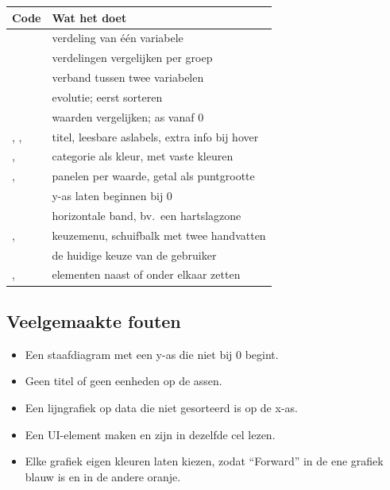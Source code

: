 \documentclass[11pt,a4paper]{article}
\begin{document}
\begin{center}
\begin{tabularx}{\textwidth}{@{}L{7.6cm}Y@{}}
\toprule
\textbf{Code} & \textbf{Wat het doet} \\
\midrule
{} & verdeling van één variabele \\
 & verdelingen vergelijken per groep \\
 & verband tussen twee variabelen \\
 & evolutie; eerst sorteren \\
 & waarden vergelijken; as vanaf 0 \\
, ,  & titel, leesbare aslabels, extra info bij hover \\
,  & categorie als kleur, met vaste kleuren \\
,  & panelen per waarde, getal als puntgrootte \\
 & y-as laten beginnen bij 0 \\
 & horizontale band, bv.\ een hartslagzone \\
,  & keuzemenu, schuifbalk met twee handvatten \\
 & de huidige keuze van de gebruiker \\
,  & elementen naast of onder elkaar zetten \\
\bottomrule
\end{tabularx}
\end{center}

\subsection*{Veelgemaakte fouten}

\begin{itemize}
  \item Een staafdiagram met een y-as die niet bij 0 begint.
  \item Geen titel of geen eenheden op de assen.
  \item Een lijngrafiek op data die niet gesorteerd is op de x-as.
  \item Een UI-element maken en zijn  in dezelfde cel lezen.
  \item Elke grafiek eigen kleuren laten kiezen, zodat ``Forward'' in de
        ene grafiek blauw is en in de andere oranje.
\end{itemize}
\end{document}
